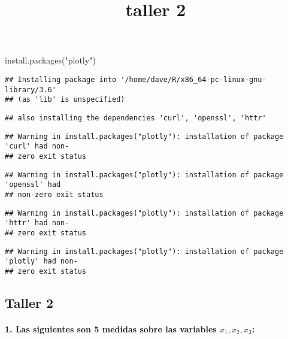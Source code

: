 \documentclass[
]{article}
\title{taller 2}
\author{}
\date{\vspace{-2.5em}}
\newenvironment{Shaded}{\begin{snugshade}}{\end{snugshade}}
\newcommand{\FunctionTok}[1]{\textcolor[rgb]{0.00,0.00,0.00}{#1}}
\newcommand{\NormalTok}[1]{#1}
\newcommand{\StringTok}[1]{\textcolor[rgb]{0.31,0.60,0.02}{#1}}
\begin{document}
\maketitle

\begin{Shaded}
\begin{Highlighting}[]
\FunctionTok{install.packages}\NormalTok{(}\StringTok{"plotly"}\NormalTok{)}
\end{Highlighting}
\end{Shaded}

\begin{verbatim}
## Installing package into '/home/dave/R/x86_64-pc-linux-gnu-library/3.6'
## (as 'lib' is unspecified)
\end{verbatim}

\begin{verbatim}
## also installing the dependencies 'curl', 'openssl', 'httr'
\end{verbatim}

\begin{verbatim}
## Warning in install.packages("plotly"): installation of package 'curl' had non-
## zero exit status
\end{verbatim}

\begin{verbatim}
## Warning in install.packages("plotly"): installation of package 'openssl' had
## non-zero exit status
\end{verbatim}

\begin{verbatim}
## Warning in install.packages("plotly"): installation of package 'httr' had non-
## zero exit status
\end{verbatim}

\begin{verbatim}
## Warning in install.packages("plotly"): installation of package 'plotly' had non-
## zero exit status
\end{verbatim}

\hypertarget{taller-2}{%
\subsection{Taller 2}\label{taller-2}}

\hypertarget{las-siguientes-son-5-medidas-sobre-las-variables-x_1-x_2-x_3}{%
\paragraph{\texorpdfstring{1. Las siguientes son 5 medidas sobre las
variables
\(x_1, x_2, x_3\):}{1. Las siguientes son 5 medidas sobre las variables x\_1, x\_2, x\_3:}}\label{las-siguientes-son-5-medidas-sobre-las-variables-x_1-x_2-x_3}}
\end{document}
